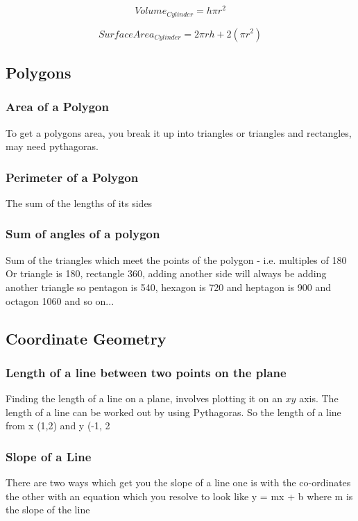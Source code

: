 \documentclass{article}
\begin{document}
\begin{equation}
Volume_{ Cylinder} = h \pi r^ 2
\end{equation}


\begin{equation}
Surface Area_{ Cylinder} = 2 \pi r h + 2(\pi r^ 2 )
\end{equation}

\newpage
\subsection{Polygons}
\subsubsection{Area of a Polygon}
To get a polygons area, you break it up into triangles or triangles and rectangles, may need pythagoras.
\subsubsection{Perimeter of a Polygon}
The sum of the lengths of its sides
\subsubsection{Sum of angles of a polygon}
Sum of the triangles which meet the points of the polygon - i.e. multiples of 180
Or triangle is 180, rectangle 360, adding another side will always be adding another triangle so
pentagon is 540, hexagon is 720 and heptagon is 900 and octagon 1060 and so on...

\newpage
\subsection{Coordinate Geometry}
\subsubsection{Length of a line between two points on the plane}
Finding the length of a line on a plane, involves plotting it on an $x y $ axis. The length of a line can be worked out by using Pythagoras. So the length of a line from x (1,2) and y (-1, 2
 
\subsubsection{Slope of a Line}
There are two ways which get you the slope of a line one is with the co-ordinates the other with an equation which you resolve to look like y = mx + b where m is the slope of the line
\end{document}
